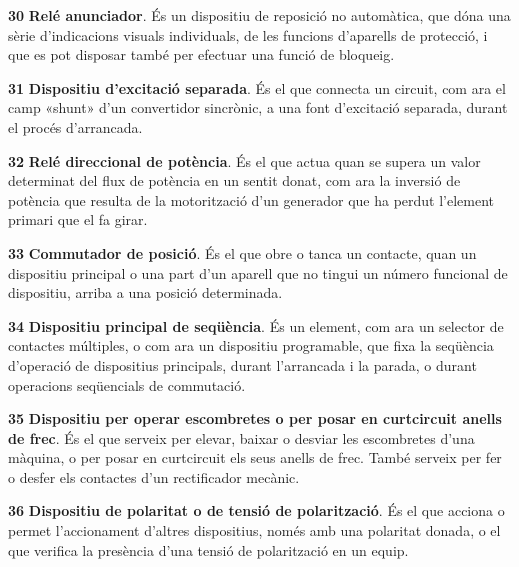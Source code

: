 \begin{multicols}{2}
\begin{list}{}
\item[\textbf{30}]  
 \textbf{Relé anunciador}. És un dispositiu de
reposició no automàtica, que dóna una sèrie d'indicacions visuals
individuals, de les funcions d'aparells de protecció, i que es pot
disposar també per efectuar una funció de bloqueig.

\item[\textbf{31}]  
\textbf{Dispositiu d'excitació
separada}. És el que connecta un circuit, com ara el camp «shunt»
d'un convertidor sincrònic, a una font d'excitació separada, durant el procés
d'arrancada.

\item[\textbf{32}]  
\textbf{Relé direccional de potència}. És el que actua quan se supera un valor determinat del
flux de potència en un sentit donat, com ara la inversió de potència que resulta de la motorització d'un generador que ha perdut l'element primari que el fa girar.

\item[\textbf{33}]  
\textbf{Commutador de posició}. És el que
obre o tanca un contacte, quan un dispositiu principal o una part d'un aparell que no tingui un número funcional de dispositiu, arriba a una posició determinada.

\item[\textbf{34}]  
\textbf{Dispositiu principal de
 seqüència}. És un element, com ara un selector de contactes múltiples, o com ara un
 dispositiu programable,
 que fixa la seqüència d'operació
de dispositius principals, durant l'arrancada i la parada, o durant  operacions seqüencials de commutació.


\item[\textbf{35}]   
\textbf{Dispositiu per operar escombretes o per posar en curtcircuit anells de frec}. És el que serveix per elevar, baixar o
desviar les escombretes d'una màquina, o per posar en curtcircuit
els seus anells de frec. També serveix per fer o desfer els
contactes d'un rectificador mecànic.

\item[\textbf{36}] 
 
\textbf{Dispositiu de
polaritat o de tensió de polarització}. És el que acciona o permet
l'accionament d'altres dispositius, només amb una polaritat
donada, o el que verifica la presència d'una tensió de polarització
en un equip.


\end{list}
\end{multicols}
